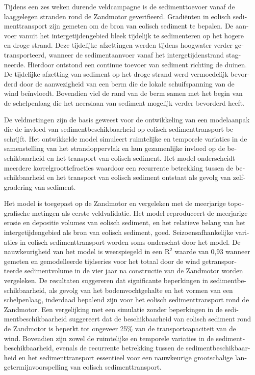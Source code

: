 \begin{otherlanguage}{dutch}
Tijdens een zes weken durende veldcampagne is de sedimenttoevoer vanaf
de laaggelegen stranden rond de Zandmotor geverifieerd. Gradi{\"e}nten
in eolisch sedimenttransport zijn gemeten om de bron van eolisch
sediment te bepalen. De aanvoer vanuit het intergetijdengebied bleek
tijdelijk te sedimenteren op het hogere en droge strand. Deze
tijdelijke afzettingen werden tijdens hoogwater verder
getransporteerd, wanneer de sedimentaanvoer vanaf het
intergetijdenstrand stagneerde. Hierdoor ontstond een continue toevoer
van sediment richting de duinen. De tijdelijke afzetting van sediment
op het droge strand werd vermoedelijk bevorderd door de aanwezigheid
van een berm die de lokale schuifspanning van de wind
be{\"i}nvloedt. Bovendien viel de rand van de berm samen met het begin
van de schelpenlaag die het neerslaan van sediment mogelijk verder
bevorderd heeft.

De veldmetingen zijn de basis geweest voor de ontwikkeling van een
modelaanpak die de invloed van sedimentbeschikbaarheid op eolisch
sedimenttransport beschrijft. Het ontwikkelde model simuleert
ruimtelijke en temporele variaties in de samenstelling van het
strandoppervlak en hun gezamenlijke invloed op de beschikbaarheid en
het transport van eolisch sediment. Het model onderscheidt meerdere
korrelgroottefracties waardoor een recurrente betrekking tussen de
beschikbaarheid en het transport van eolisch sediment ontstaat als
gevolg van zelfgradering van sediment.

Het model is toegepast op de Zandmotor en vergeleken met de meerjarige
topografische metingen als eerste veldvalidatie. Het model
reproduceert de meerjarige erosie en depositie volumes van eolisch
sediment, en het relatieve belang van het intergetijdengebied als bron
van eolisch sediment, goed. Seizoensafhankelijke variaties in eolisch
sedimenttransport worden soms onderschat door het model. De
nauwkeurigheid van het model is weerspiegeld in een $\mathrm{R^2}$
waarde van 0,93 wanneer gemeten en gemodelleerde tijdseries voor het
totaal door de wind getransporteerde sedimentvolume in de vier jaar na
constructie van de Zandmotor worden vergeleken. De resultaten
suggereren dat significante beperkingen in sedimentbeschikbaarheid,
als gevolg van het bodemvochtgehalte en het vormen van een
schelpenlaag, inderdaad bepalend zijn voor het eolisch
sedimenttransport rond de Zandmotor. Een vergelijking met een
simulatie zonder beperkingen in de sedimentbeschikbaarheid suggereert
dat de beschikbaarheid van eolisch sediment rond de Zandmotor is
beperkt tot ongeveer 25\% van de transportcapaciteit van de
wind. Bovendien zijn zowel de ruimtelijke en temporele variaties in de
sedimentbeschikbaarheid, evenals de recurrente betrekking tussen de
sedimentbeschikbaarheid en het sedimenttransport essentieel voor een
nauwkeurige grootschalige langetermijnvoorspelling van eolisch
sedimenttransport.
\end{otherlanguage}


